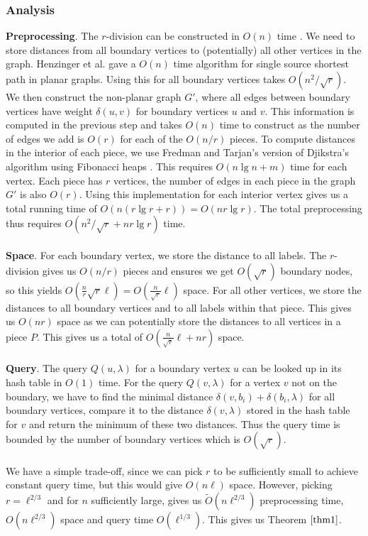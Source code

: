 \subsubsection{Analysis}\label{oracle1analysis}
\textbf{Preprocessing}. The $r$-division can be constructed in $O(n)$ time
\cite{klein2013structured}. We need to store distances from all boundary vertices to (potentially)
all other vertices in the graph. Henzinger et al. \cite{henzinger1997faster} gave a $O(n)$
time algorithm for single source shortest path in planar graphs. Using this for all
boundary vertices takes $O(n^2/\sqrt{r})$. We then construct the non-planar graph $G'$, where all
edges between boundary vertices have weight $\delta(u,v)$ for boundary vertices $u$ and
$v$. This information is computed in the previous step and takes $O(n)$ time to
construct as the number of edges we add is $O(r)$ for each of the $O(n/r)$ pieces. To compute distances in the interior of each
piece, we use Fredman and Tarjan's version of Djikstra's algorithm using Fibonacci heaps
\cite{fredman1987fibonacci}. This requires $O(n\lg n + m)$ time for each vertex. Each
piece has $r$ vertices, the number of edges in each piece in the graph $G'$ is also $O(r)$. Using
this implementation for each interior vertex gives us a total running time of $O(n(r\lg r
+ r))=O(nr\lg
r)$. The total preprocessing thus requires $O(n^2/\sqrt{r}+nr\lg r)$ time. \\
\\
\textbf{Space}. For each boundary vertex, we store the distance to all labels. The $r$-division gives us
$O(n/r)$ pieces and ensures we
get $O(\sqrt{r})$ boundary nodes, so this yields
$O(\frac{n}{r}\sqrt{r}\ell)=O(\frac{n}{\sqrt{r}}\ell)$ space. For all other vertices, we
store the distances to all boundary vertices and to all labels within that piece. This
gives us $O(nr)$ space as we can potentially store the distances to all vertices in a
piece $P$. This gives us a total of $O(\frac{n}{\sqrt{r}}\ell+nr)$ space. \\
\\
\textbf{Query}. The query $Q(u,\lambda)$ for a boundary vertex $u$ can be looked up in its hash table in
$O(1)$ time. For the query $Q(v,\lambda)$ for a vertex $v$ not on the boundary, we have
to find the minimal distance $\delta(v,b_i)+\delta(b_i,\lambda)$ for all boundary
vertices, compare it to the distance $\delta(v,\lambda)$ stored in the hash table for $v$
and return the minimum of these two distances. Thus the query time is bounded by the
number of boundary vertices which is $O(\sqrt{r})$. \\
\\
We have a simple trade-off, since we can pick $r$ to be sufficiently small to
achieve constant query time, but this would give $O(n\ell)$ space. However, picking
$r=\ell^{2/3}$ and for $n$ sufficiently large, gives us $\tilde{O}(n\ell^{2/3})$ preprocessing time, $O(n\ell^{2/3})$ space and query time $O(\ell^{1/3})$. This gives us Theorem $\ref{thm1}$.

